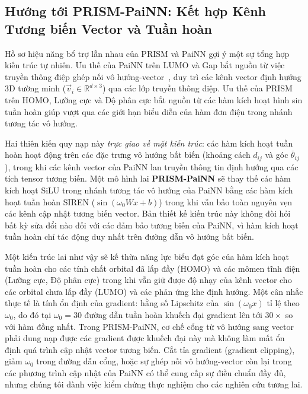 \documentclass[10pt,twocolumn,letterpaper]{article}
\begin{document}
\subsection{Hướng tới PRISM-PaiNN: Kết hợp Kênh Tương biến Vector và Tuần hoàn}
\label{sec:prism_painn}

Hồ sơ hiệu năng bổ trợ lẫn nhau của PRISM và PaiNN gợi ý một sự tổng hợp kiến trúc tự nhiên. Ưu thế của PaiNN trên LUMO và Gap bắt nguồn từ việc truyền thông điệp ghép nối vô hướng-vector~\cite{schuttEquivariantMessagePassing2021}, duy trì các kênh vector định hướng 3D tường minh ($\vec{v}_i \in \mathbb{R}^{d \times 3}$) qua các lớp truyền thông điệp. Ưu thế của PRISM trên HOMO, Lưỡng cực và Độ phân cực bắt nguồn từ các hàm kích hoạt hình sin tuần hoàn giúp vượt qua các giới hạn biểu diễn của hàm đơn điệu trong nhánh tương tác vô hướng.

Hai thiên kiến quy nạp này \textit{trực giao về mặt kiến trúc}: các hàm kích hoạt tuần hoàn hoạt động trên các đặc trưng vô hướng bất biến (khoảng cách $d_{ij}$ và góc $\bar{\theta}_{ij}$), trong khi các kênh vector của PaiNN lan truyền thông tin định hướng qua các tích tensor tương biến. Một mô hình lai \textbf{PRISM-PaiNN} sẽ thay thế các hàm kích hoạt SiLU trong nhánh tương tác vô hướng của PaiNN bằng các hàm kích hoạt tuần hoàn SIREN ($\sin(\omega_0 W x + b)$) trong khi vẫn bảo toàn nguyên vẹn các kênh cập nhật tương biến vector. Bản thiết kế kiến trúc này không đòi hỏi bất kỳ sửa đổi nào đối với các đảm bảo tương biến của PaiNN, vì hàm kích hoạt tuần hoàn chỉ tác động duy nhất trên đường dẫn vô hướng bất biến.

Một kiến trúc lai như vậy sẽ kế thừa năng lực biểu đạt góc của hàm kích hoạt tuần hoàn cho các tính chất orbital đã lấp đầy (HOMO) và các mômen tĩnh điện (Lưỡng cực, Độ phân cực) trong khi vẫn giữ được độ nhạy của kênh vector cho các orbital chưa lấp đầy (LUMO) và các phản ứng khe định hướng.
Một cân nhắc thực tế là tính ổn định của gradient: hằng số Lipschitz của $\sin(\omega_0 x)$ tỉ lệ theo $\omega_0$, do đó tại $\omega_0 = 30$ đường dẫn tuần hoàn khuếch đại gradient lên tới $30\times$ so với hàm đồng nhất. Trong PRISM-PaiNN, cơ chế cổng từ vô hướng sang vector phải dung nạp được các gradient được khuếch đại này mà không làm mất ổn định quá trình cập nhật vector tương biến. Cắt tỉa gradient (gradient clipping), giảm $\omega_0$ trong đường dẫn cổng, hoặc sự ghép nối vô hướng-vector còn lại trong các phương trình cập nhật của PaiNN có thể cung cấp sự điều chuẩn đầy đủ, nhưng chúng tôi dành việc kiểm chứng thực nghiệm cho các nghiên cứu tương lai.
\end{document}
